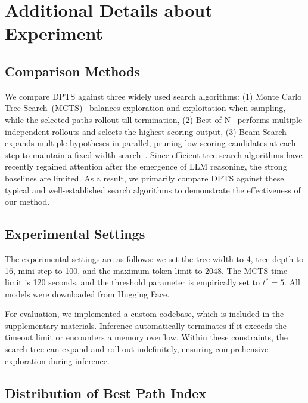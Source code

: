 \section{Additional Details about Experiment}
\label{app:sec:exp}

\subsection{Comparison Methods}
\label{app:sec:comparison_methods}

We compare DPTS against three widely used search algorithms: (1) Monte Carlo Tree Search~(MCTS)~\cite{sprueill2023monte} balances exploration and exploitation when sampling, while the selected paths rollout till termination, (2) Best-of-N~\cite{cobbe2021training} performs multiple independent rollouts and selects the highest-scoring output, (3) Beam Search~\cite{Yao_2023_Tree} expands multiple hypotheses in parallel, pruning low-scoring candidates at each step to maintain a fixed-width search~\cite{snell2024scaling}. 
Since efficient tree search algorithms have recently regained attention after the emergence of LLM reasoning, the strong baselines are limited. As a result, we primarily compare DPTS against these typical and well-established search algorithms to demonstrate the effectiveness of our method. 

 
\subsection{Experimental Settings}
\label{app:sec:exp_setting}


The experimental settings are as follows: we set the tree width to 4, tree depth to 16, mini step to 100, and the maximum token limit to 2048. The MCTS time limit is 120 seconds, and the threshold parameter is empirically set to $t^*=5$. All models were downloaded from Hugging Face.

For evaluation, we implemented a custom codebase, which is included in the supplementary materials. Inference automatically terminates if it exceeds the timeout limit or encounters a memory overflow. Within these constraints, the search tree can expand and roll out indefinitely, ensuring comprehensive exploration during inference. 

\subsection{Distribution of Best Path Index}
\label{app:sec:best_path_index}

